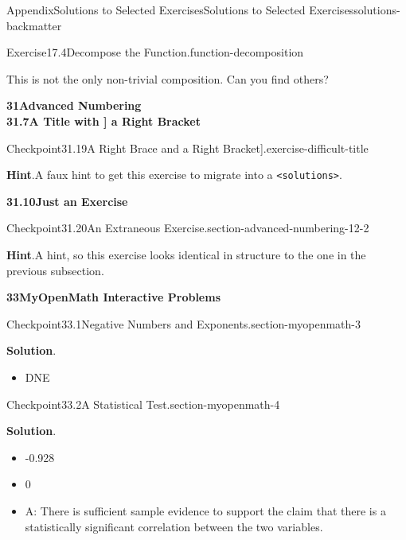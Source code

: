 \documentclass[twoside,10pt,]{article}
\newcommand{\blocktitlefont}{\relax}
\newcommand{\mono}[1]{\texttt{#1}}
\numberwithin{equation}{section}
\begin{document}
\begin{solutions-section}{Appendix}{Solutions to Selected Exercises}{}{Solutions to Selected Exercises}{}{}{solutions-backmatter}
\begin{divisionsolution}{Exercise}{17.4}{Decompose the Function.}{function-decomposition}
\par
This is not the only non-trivial composition. Can you find others?%
\end{divisionsolution}%
\par\medskip
\noindent\textbf{\large{}31\space\textperiodcentered\space{}Advanced Numbering\\
31.7\space\textperiodcentered\space{}A Title with ] a Right Bracket}
\begin{inlinesolution}{Checkpoint}{31.19}{A Right Brace \textbraceright{} and a Right Bracket].}{exercise-difficult-title}%
\par\smallskip%
\noindent\textbf{\blocktitlefont Hint}.\hypertarget{exercise-difficult-title-3-back}{}\quad{}A faux hint to get this exercise to migrate into a \mono{<solutions>}.%
\end{inlinesolution}%
\par\medskip
\noindent\textbf{\large{}31.10\space\textperiodcentered\space{}Just an Exercise}
\begin{inlinesolution}{Checkpoint}{31.20}{An Extraneous Exercise.}{section-advanced-numbering-12-2}%
\par\smallskip%
\noindent\textbf{\blocktitlefont Hint}.\hypertarget{section-advanced-numbering-12-2-3-back}{}\quad{}A hint, so this exercise looks identical in structure to the one in the previous subsection.%
\end{inlinesolution}%
\par\medskip
\noindent\textbf{\large{}33\space\textperiodcentered\space{}MyOpenMath Interactive Problems}
\begin{inlinesolution}{Checkpoint}{33.1}{Negative Numbers and Exponents.}{section-myopenmath-3}%
\par\smallskip%
\noindent\textbf{\blocktitlefont Solution}.\hypertarget{section-myopenmath-3-3-back}{}\quad{}%
\begin{itemize}[label=\textbullet]
\item{}DNE%
\end{itemize}
%
\end{inlinesolution}%
\begin{inlinesolution}{Checkpoint}{33.2}{A Statistical Test.}{section-myopenmath-4}%
\par\smallskip%
\noindent\textbf{\blocktitlefont Solution}.\hypertarget{section-myopenmath-4-3-back}{}\quad{}%
\begin{itemize}[label=\textbullet]
\item{}-0.928%
\item{}0%
\item{}A: There is sufficient sample evidence to support the claim that there is a statistically significant  correlation between the two variables.%

\end{itemize}
\end{inlinesolution}
\end{solutions-section}
\end{document}
